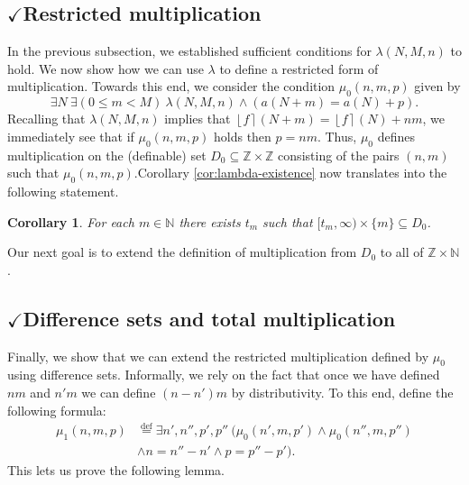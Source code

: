 \documentclass{amsart}
\newtheorem{corollary}[theorem]{Corollary}
\theoremstyle{definition}
\newcommand{\nint}[1]{\left\lfloor #1 \right\rceil}
\newcommand{\NN}{\mathbb{N}}
\newcommand{\ZZ}{\mathbb{Z}}
\renewcommand{\subset}{\subseteq}
\newcommand{\defeq}{\overset{\mathrm{def}}{=}}
\begin{document}
\subsection{$\checkmark$Restricted multiplication}
In the previous subsection, we established sufficient conditions for $\lambda(N,M,n)$ to hold. We now show how we can use $\lambda$ to define a restricted form of multiplication. Towards this end, we consider the condition $\mu_0(n,m,p)$ given by 
\begin{equation*}
\exists N \ \exists (0 \leq m < M) \ \lambda(N,M,n) \wedge (a(N+m) = a(N) + p).
\end{equation*}
Recalling that $\lambda(N,M,n)$ implies that $\nint{f}(N+m) = \nint{f}(N) + nm$, we immediately see that if $\mu_0(n,m,p)$ holds then $p = nm$. Thus, $\mu_0$ defines multiplication on the (definable) set $D_0 \subset \ZZ \times \ZZ$ consisting of the pairs $(n,m)$ such that $\mu_0(n,m,p)$.Corollary \ref{cor:lambda-existence} now translates into the following statement.

\begin{corollary}\label{cor:mu-existence}
For each $m \in \NN$ there exists $t_m$ such that $[t_m,\infty) \times \{m\} \subset D_0$.
\end{corollary}

Our next goal is to extend the definition of multiplication from $D_0$ to all of $\ZZ \times \NN$. 

\subsection{$\checkmark$Difference sets and total multiplication}

Finally, we show that we can extend the restricted multiplication defined by $\mu_0$ using difference sets. Informally, we rely on the fact that once we have defined $n m$ and $n' m$ we can define $(n-n')m$ by distributivity. To this end, define the following formula:
\begin{align*}
\mu_1 (n,m,p) &\defeq \exists n',n'',p',p''\ (\mu_0(n',m,p') \wedge \mu_0(n'',m,p'')\\\nonumber &\wedge n = n''-n' \wedge p = p''-p').
\end{align*}
This lets us prove the following lemma.
\end{document}
